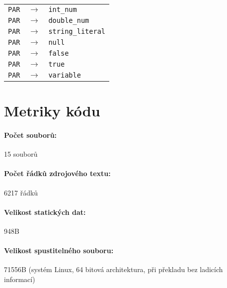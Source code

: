 \documentclass[12pt,a4paper,titlepage,final]{article}
\begin{document}
\begin{tabular}{ l r l }
      \hline
      \texttt{PAR} & $\rightarrow$ & \texttt{int\_num} \\
      \texttt{PAR} & $\rightarrow$ & \texttt{double\_num} \\
      \texttt{PAR} & $\rightarrow$ & \texttt{string\_literal} \\
      \texttt{PAR} & $\rightarrow$ & \texttt{null} \\
      \texttt{PAR} & $\rightarrow$ & \texttt{false} \\
      \texttt{PAR} & $\rightarrow$ & \texttt{true} \\
      \texttt{PAR} & $\rightarrow$ & \texttt{variable} \\
      \hline

    \end{tabular}

    \newpage

  \section{Metriky kódu} \label{metriky}

    \setlength{\parskip}{0cm}
    \paragraph{Počet souborů:} 15 souborů
    \paragraph{Počet řádků zdrojového textu:} 6217 řádků
    \paragraph{Velikost statických dat:} 948B
    \paragraph{Velikost spustitelného souboru:} 71556B (systém Linux, 64
    bitová architektura, při pře\-kladu bez ladicích informací)

\end{document}

